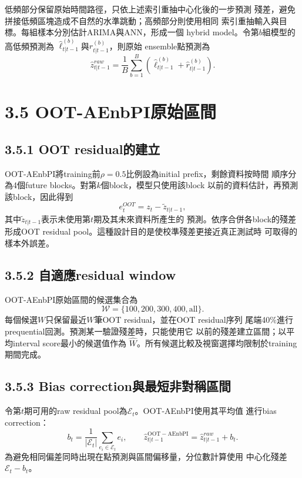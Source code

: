 低頻部分保留原始時間路徑，只依上述索引重抽中心化後的一步預測
殘差，避免拼接低頻區塊造成不自然的水準跳動；高頻部分則使用相同
索引重抽輸入與目標。每組樣本分別估計ARIMA與ANN，形成一個
hybrid model。令第$b$組模型的高低頻預測為
$\widehat\ell_{t|t-1}^{(b)}$與$\widehat r_{t|t-1}^{(b)}$，則原始
ensemble點預測為
\begin{equation}
 \widehat z_{t|t-1}^{raw}
 =\frac{1}{B}\sum_{b=1}^{B}
 \left(\widehat\ell_{t|t-1}^{(b)}+
 \widehat r_{t|t-1}^{(b)}\right).
\end{equation}

\section*{3.5 OOT-AEnbPI原始區間}

\subsection*{3.5.1 OOT residual的建立}

OOT-AEnbPI將training前$\rho=0.5$比例設為initial prefix，剩餘資料按時間
順序分為4個future blocks。對第$k$個block，模型只使用該block
以前的資料估計，再預測該block，因此得到
\begin{equation}
 e_t^{OOT}=z_t-\widetilde z_{t|t-1},
\end{equation}
其中$\widetilde z_{t|t-1}$表示未使用第$t$期及其未來資料所產生的
預測。依序合併各block的殘差形成OOT residual pool。這種設計目的是使校準殘差更接近真正測試時
可取得的樣本外誤差。

\subsection*{3.5.2 自適應residual window}

OOT-AEnbPI原始區間的候選集合為
\begin{equation}
 \mathcal W=\{100,200,300,400,\mathrm{all}\}.
\end{equation}
每個候選$W$只保留最近$W$筆OOT residual，並在OOT residual序列
尾端40\%進行prequential回測。預測某一驗證殘差時，只能使用它
以前的殘差建立區間；以平均interval score最小的候選值作為
$\widehat W$。所有候選比較及視窗選擇均限制於training期間完成。

\subsection*{3.5.3 Bias correction與最短非對稱區間}

令第$t$期可用的raw residual pool為$\mathcal E_t$。OOT-AEnbPI使用其平均值
進行bias correction：
\begin{equation}
 b_t=\frac{1}{|\mathcal E_t|}\sum_{e_i\in\mathcal E_t}e_i,
 \qquad
 \widehat z_{t|t-1}^{\mathrm{OOT-AEnbPI}}=\widehat z_{t|t-1}^{raw}+b_t.
\end{equation}
為避免相同偏差同時出現在點預測與區間偏移量，分位數計算使用
中心化殘差$\mathcal E_t-b_t$。

